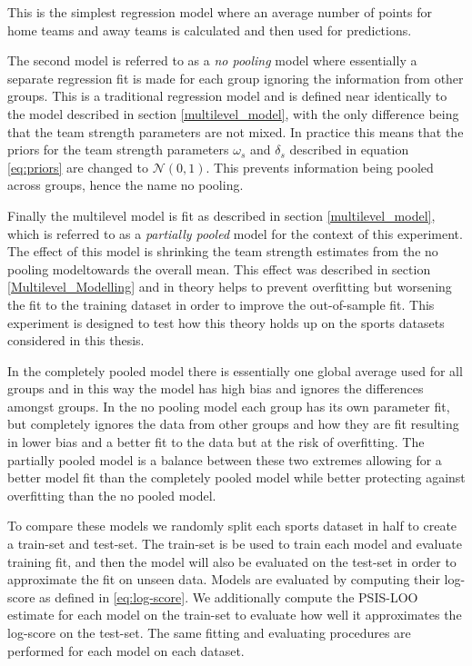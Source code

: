 This is the simplest regression model where an average number of points for home teams and away teams is calculated and then used for predictions.

The second model is referred to as a \textit{no pooling} model where essentially a separate regression fit is made for each group ignoring the information from other groups. This is a traditional regression model and is defined near identically to the model described in section \ref{multilevel_model}, with the only difference being that the team strength parameters are not mixed. In practice this means that the priors for the team strength parameters $\omega_s$ and $\delta_s$ described in equation \ref{eq:priors} are changed to $\mathcal{N}(0, 1)$. This prevents information being pooled across groups, hence the name no pooling.

Finally the multilevel model is fit as described in section \ref{multilevel_model}, which is referred to as a \textit{partially pooled} model for the context of this experiment. The effect of this model is shrinking the team strength estimates from the no pooling modeltowards the overall mean. This effect was described in section \ref{Multilevel_Modelling} and in theory helps to prevent overfitting but worsening the fit to the training dataset in order to improve the out-of-sample fit. This experiment is designed to test how this theory holds up on the sports datasets considered in this thesis.

In the completely pooled model there is essentially one global average used for all groups and in this way the model has high bias and ignores the differences amongst groups. In the no pooling model each group has its own parameter fit, but completely ignores the data from other groups and how they are fit resulting in lower bias and a better fit to the data but at the risk of overfitting. The partially pooled model is a balance between these two extremes allowing for a better model fit than the completely pooled model while better protecting against overfitting than the no pooled model.

To compare these models we randomly split each sports dataset in half to create a train-set and test-set. The train-set is be used to train each model and evaluate training fit, and then the model will also be evaluated on the test-set in order to approximate the fit on unseen data. Models are evaluated by computing their log-score as defined in \ref{eq:log-score}. We additionally compute the PSIS-LOO estimate for each model on the train-set to evaluate how well it approximates the log-score on the test-set. The same fitting and evaluating procedures are performed for each model on each dataset.

